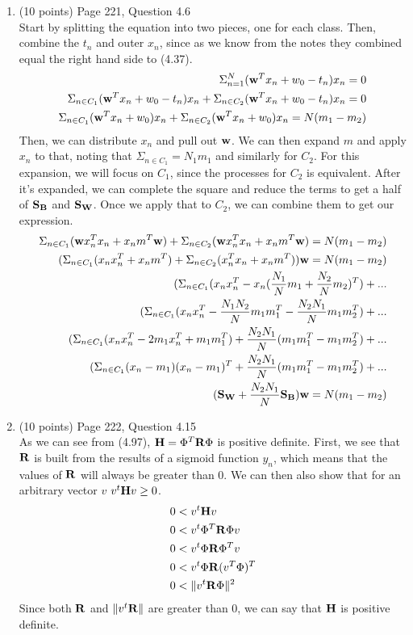 \documentclass[11pt]{article}
\begin{document}
\begin{enumerate}
\item (10 points) Page 221, Question 4.6\\
Start by splitting the equation into two pieces, one for each class. Then, combine the $t_n$ and outer $x_n$, since as we know 
from the notes they combined equal the right hand side to (4.37).
\begin{align*}
    \Sigma_{n=1}^N (\mathbf{w}^T x_n + w_0 -t_n)x_n = 0 \\
    \Sigma_{n \in C_1} (\mathbf{w}^T x_n + w_0 -t_n)x_n + \Sigma_{n \in C_2} (\mathbf{w}^T x_n + w_0 -t_n)x_n = 0 \\
    \Sigma_{n \in C_1} (\mathbf{w}^T x_n + w_0 )x_n + \Sigma_{n \in C_2} (\mathbf{w}^T x_n + w_0 )x_n = N(m_1 - m_2)
\end{align*}
Then, we can distribute $x_n$ and pull out $\mathbf{w}$. We can then expand $m$ and apply $x_n$ to that, noting that $\Sigma_{n \in C_1} = N_1m_1$ 
and similarly for $C_2$. For this expansion, we will focus on $C_1$, since the processes for $C_2$ is equivalent. After it's expanded, we can
complete the square and reduce the terms to get a half of $\mathbf{S}_{\mathbf{B}}$ and $\mathbf{S}_{\mathbf{W}}$. Once we apply that to $C_2$, we 
can combine them to get our expression.
\begin{align*}
    \Sigma_{n \in C_1} (\mathbf{w} x_n^T x_n + x_n m^T \mathbf{w})  + \Sigma_{n \in C_2} (\mathbf{w} x_n^T x_n + x_n m^T \mathbf{w}) = N(m_1 - m_2)\\
    (\Sigma_{n \in C_1} (x_n x_n^T + x_n m^T) + \Sigma_{n \in C_2} (x_n^T x_n + x_n m^T)) \mathbf{w} = N(m_1 - m_2)\\
    (\Sigma_{n \in C_1} (x_n x_n^T - x_n (\frac{N_1}{N}m_1 + \frac{N_2}{N}m_2)^T) + ...\\
    (\Sigma_{n \in C_1} (x_n x_n^T - \frac{N_1N_2}{N}m_1m_1^T - \frac{N_2N_1}{N}m_1m_2^T) + ...\\
    (\Sigma_{n \in C_1} (x_n x_n^T - 2 m_1x_n^T + m_1m_1^T) + \frac{N_2N_1}{N}(m_1m_1^T - m_1m_2^T) +...\\
    (\Sigma_{n \in C_1} (x_n - m_1)(x_n - m_1)^T + \frac{N_2N_1}{N}(m_1m_1^T - m_1m_2^T) +...\\
    (\mathbf{S}_{\mathbf{W}} + \frac{N_2N_1}{N}\mathbf{S}_{\mathbf{B}})\mathbf{w} = N(m_1 - m_2)
\end{align*}

\item (10 points) Page 222, Question 4.15\\
As we can see from (4.97), $\mathbf{H} = \Phi^T \mathbf{R} \Phi$ is positive definite. First, we see that $\mathbf{R}$ is built from the results of a sigmoid function $y_n$,  
which means that the values of $\mathbf{R}$ will always be greater than 0. We can then also show that for an arbitrary vector $v$ $v^t \mathbf{H} v \geq 0$.
\begin{align*}
    0 &< v^t \mathbf{H} v\\
    0 &< v^t \Phi^T \mathbf{R} \Phi v\\
    0 &< v^t \Phi \mathbf{R} \Phi^T v\\
    0 &< v^t \Phi \mathbf{R} (v^T \Phi)^T\\
    0 &< \| v^t \mathbf{R} \Phi \|^2 \\
\end{align*}
Since both $\mathbf{R}$ and $\| v^t \mathbf{R} \|$ are greater than 0, we can say that $\mathbf{H}$ is positive definite.


\end{enumerate}
\end{document}
